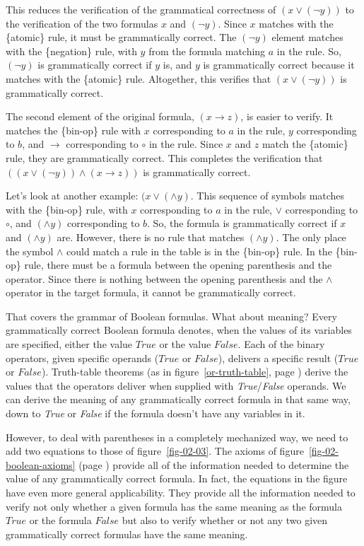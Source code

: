 This reduces the verification of the grammatical correctness of $(x \vee (\neg y))$
to the verification of the two formulas $x$ and $(\neg y)$.
Since $x$ matches with the \{atomic\} rule, it must be grammatically correct.
The $(\neg y)$ element matches with the \{negation\} rule,
with $y$ from the formula matching $a$ in the rule.
So, $(\neg y)$ is grammatically correct if $y$ is,
and $y$ is grammatically correct because it matches with the \{atomic\} rule.
Altogether, this verifies that $(x \vee (\neg y))$ is grammatically correct.

The second element of the original formula,
$(x \rightarrow z)$, is easier to verify.
It matches the \{bin-op\} rule with $x$ corresponding to $a$ in the rule,
$y$ corresponding to $b$, and $\rightarrow$ corresponding to $\circ$ in the rule.
Since $x$ and $z$ match the \{atomic\} rule, they are grammatically correct.
This completes the verification that
$((x \vee (\neg y)) \wedge (x \rightarrow z))$
is grammatically correct.

Let's look at another example: $(x \vee (\wedge y)$.
This sequence of symbols matches with the \{bin-op\} rule,
with $x$ corresponding to $a$ in the rule,
$\vee$ corresponding to $\circ$,
and $(\wedge y)$ corresponding to $b$.
So, the formula is grammatically correct
if $x$ and $(\wedge y)$ are.
However, there is no rule that matches $(\wedge y)$.
The only place the symbol $\wedge$ could match a rule
in the table is in the \{bin-op\} rule.
In the \{bin-op\} rule, there must be
a formula between
the opening parenthesis and the operator.
Since there is nothing
between the opening parenthesis
and the $\wedge$ operator in the target formula,
it cannot be grammatically correct.

That covers the grammar of Boolean formulas.
What about meaning?
Every grammatically correct Boolean formula denotes,
when the values of its variables are specified,
either the value $True$ or the value $False$.
Each of the binary operators, given specific operands ($True$ or $False$),
delivers a specific result ($True$ or $False$).
Truth-table theorems
(as in figure~\ref{or-truth-table}, page \pageref{or-truth-table})
derive the values that the operators deliver when
supplied with \emph{True}/\emph{False} operands.
We can derive the meaning of any grammatically correct formula
in that same way, down to \emph{True} or \emph{False} if the formula
doesn't have any variables in it.

However, to deal with parentheses in a completely mechanized way,
we need to add two equations to those of figure~\ref{fig-02-03}.
The axioms of figure~\ref{fig-02-boolean-axioms} (page \pageref{fig-02-boolean-axioms})
provide all of the information needed to determine
the value of any grammatically correct formula.
In fact, the equations in the figure have even more general applicability.
They provide all the information needed
to verify not only whether a given formula
has the same meaning as the formula $True$ or the formula $False$
but also to verify whether or not any two given
grammatically correct formulas have the same meaning.

